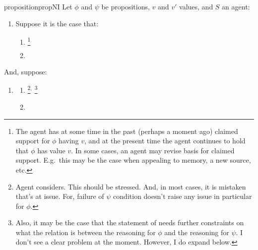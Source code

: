 \begin{note}[\nI{}]

  \begin{restatable}[\nI{-}  --- \nI{}]{proposition}{propNI}\label{prem:ni}
    Let \(\phi\) and \(\psi\) be propositions, \(v\) and \(v'\) values, and \(S\) an agent:
    \begin{enumerate}[ref=\named{\nIacro{}:\arabic*}, series=nI_counter]
    \item\label{nI:background}
      Suppose it is the case that:
      \begin{enumerate}[label=\alph*., ref=\named{\nIacro{}1:\alph*}]
      \item\label{nI:background:phi} \nIClauseClaimedSupport{}\nolinebreak
        \footnote{
          The agent has at some time in the past (perhaps a moment ago) claimed support for \(\phi\) having \(v\), and at the present time the agent continues to hold that \(\phi\) has value \(v\).
          In some cases, an agent may revise basis for claimed support.
          E.g.\ this may be the case when appealing to memory, a new source, etc.
        }
      \item\label{nI:background:psi} \nIClausePsiIsNew{}
      \end{enumerate}
    \end{enumerate}
    And, suppose:
    \begin{enumerate}[ref=\named{\nIacro{}:\arabic*}, resume*=nI_counter]
    \item\label{nI:inclusion} \nIClauseInclusion{}
      \begin{enumerate}[label=\alph*., ref=\named{\nIacro{}2:\alph*}]
      \item\label{nI:inclusion:position} \nIClauseInclusionPosition{}\nolinebreak
        \footnote{
          Agent considers.
          This should be stressed.
          And, in most cases, it is mistaken that's at issue.
          For, failure of \(\psi\) condition doesn't raise any issue in particular for \(\phi\).
        }\(^{,}\)\nolinebreak
        \footnote{
          Also, it may be the case that the statement of \nI{} needs further constraints on what the relation is between the reasoning for \(\phi\) and the reasoning for \(\psi\).
          I don't see a clear problem at the moment.
          However, I do expand below.
        }
      \item\label{nI:inclusion:bound} \nIClauseInclusioBound{}
      \end{enumerate}
    \end{enumerate}

\end{restatable}
\end{note}
